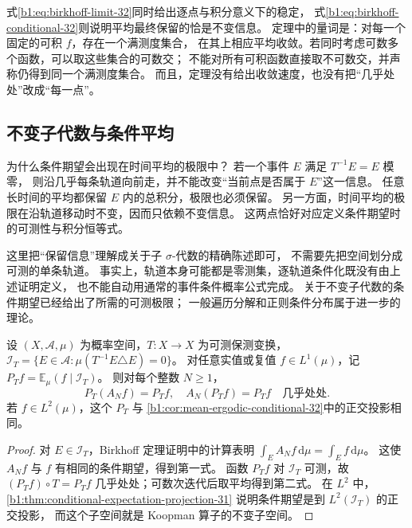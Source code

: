 式\eqref{b1:eq:birkhoff-limit-32}同时给出逐点与积分意义下的稳定，
式\eqref{b1:eq:birkhoff-conditional-32}则说明平均最终保留的恰是不变信息。
定理中的量词是：对每一个固定的可积 \(f\)，存在一个满测度集合，
在其上相应平均收敛。若同时考虑可数多个函数，可以取这些集合的可数交；
不能对所有可积函数直接取不可数交，并声称仍得到同一个满测度集合。
而且，定理没有给出收敛速度，也没有把“几乎处处”改成“每一点”。

\subsection{不变子代数与条件平均}
\label{b1:subsec:320402}

为什么条件期望会出现在时间平均的极限中？
若一个事件 \(E\) 满足 \(T^{-1}E=E\) 模零，
则沿几乎每条轨道向前走，并不能改变“当前点是否属于 \(E\)”这一信息。
任意长时间的平均都保留 \(E\) 内的总积分，极限也必须保留。
另一方面，时间平均的极限在沿轨道移动时不变，因而只依赖不变信息。
这两点恰好对应定义条件期望时的可测性与积分恒等式。

\ProseParagraphBreak

这里把“保留信息”理解成关于子 \(\sigma\)-代数的精确陈述即可，
不需要先把空间划分成可测的单条轨道。
事实上，轨道本身可能都是零测集，逐轨道条件化既没有由上述证明定义，
也不能自动用通常的事件条件概率公式完成。
关于不变子代数的条件期望已经给出了所需的可测极限；
一般遍历分解和正则条件分布属于进一步的理论。

\begin{proposition}[先取时间平均与先保留不变信息]
\label{b1:prop:ergodic-conditional-commutation-32}
设 \((X,\mathcal A,\mu)\) 为概率空间，\(T:X\to X\) 为可测保测变换，
\(\mathcal I_T=\{E\in\mathcal A:\mu(T^{-1}E\triangle E)=0\}\)。
对任意实值或复值 \(f\in L^1(\mu)\)，记 \(P_Tf=\mathbb E_\mu(f\mid\mathcal I_T)\)。
则对每个整数 \(N\geq1\)，
\[
 P_T(A_Nf)=P_Tf,\quad A_N(P_Tf)=P_Tf
 \quad\text{几乎处处}.
\]
若 \(f\in L^2(\mu)\)，这个 \(P_T\) 与
\cref{b1:cor:mean-ergodic-conditional-32}中的正交投影相同。
\end{proposition}
\begin{proof}
对 \(E\in\mathcal I_T\)，Birkhoff 定理证明中的计算表明
\(\int_EA_Nf\,\mathrm d\mu=\int_Ef\,\mathrm d\mu\)。
这使 \(A_Nf\) 与 \(f\) 有相同的条件期望，得到第一式。
函数 \(P_Tf\) 对 \(\mathcal I_T\) 可测，故
\((P_Tf)\circ T=P_Tf\) 几乎处处；可数次迭代后取平均得到第二式。
在 \(L^2\) 中，\cref{b1:thm:conditional-expectation-projection-31}%
说明条件期望是到 \(L^2(\mathcal I_T)\) 的正交投影，
而这个子空间就是 Koopman 算子的不变子空间。
\end{proof}


